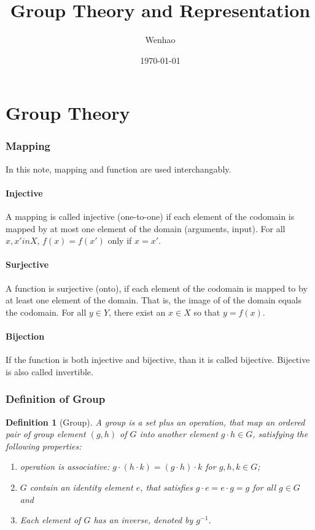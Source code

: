 \documentclass{amsart}
\newtheorem{definition}{Definition}
\begin{document}
\title{Group Theory and Representation}
\author{Wenhao}
\date{\today}
\maketitle

\part{Group Theory}

\section*{Mapping}
In this note, mapping and function are used interchangably. 
\subsection*{Injective}
A mapping is called injective (one-to-one) if each element of the codomain is mapped by 
at most one element of the domain (arguments, input). 
For all $x,x' in X$, $f(x)=f(x')$ only if $x=x'$.
\vspace{-10pt} %
\subsection*{Surjective}
A function is surjective (onto), if each element of the codomain is mapped to by at least one element of 
the domain. That is, the image of of the domain equals the codomain. 
For all $y\in Y$, there exist an $x\in X$ so that $y=f(x)$.
\vspace{-10pt} %
\subsection*{Bijection}
If the function is both injective and bijective, than it is called bijective. Bijective is also called invertible.


\section*{Definition of Group}
\begin{definition}[Group]
    A group is a set plus an operation, that map an ordered pair of group element $(g,h)$ of $G$ into another element $g\cdot h \in G$, satisfying
    the following properties:
    \begin{enumerate}
        \item operation is associative: $g\cdot (h \cdot k) = (g\cdot h) \cdot k$ for $g,h,k \in G$;
        \item $G$ contain an identity element $e$, that satisfies $g\cdot e = e\cdot g = g$ for all $g \in G$ and 
        \item Each element of $G$ has an inverse, denoted by $g^{-1}$.
    \end{enumerate}  
\end{definition}
\end{document}
